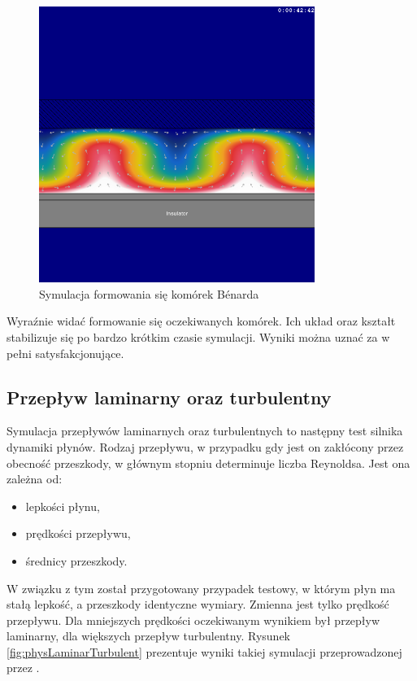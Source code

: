 \begin{figure}[!h]
\centering
\includegraphics[width=0.8\textwidth]{img/physics/benard}
\caption{Symulacja formowania się komórek Bénarda}
\label{fig:physBenard}
\end{figure}

Wyraźnie widać formowanie się oczekiwanych komórek. Ich układ oraz kształt
stabilizuje się po bardzo krótkim czasie symulacji. Wyniki można uznać za w
pełni satysfakcjonujące.

\subsection{Przepływ laminarny oraz turbulentny}
\label{sec:przeplywyLamTur}

Symulacja przepływów laminarnych oraz turbulentnych to następny test silnika
dynamiki płynów. Rodzaj przepływu, w przypadku gdy jest on zakłócony przez
obecność przeszkody, w głównym stopniu determinuje liczba Reynoldsa. Jest ona
zależna od:

\begin{itemize}
\item lepkości płynu,
\item prędkości przepływu,
\item średnicy przeszkody.
\end{itemize}

W związku z tym został przygotowany przypadek testowy, w którym płyn ma stałą
lepkość, a przeszkody identyczne wymiary. Zmienna jest tylko prędkość przepływu.
Dla mniejszych prędkości oczekiwanym wynikiem był przepływ laminarny, dla
większych przepływ turbulentny. Rysunek \ref{fig:physLaminarTurbulent}
prezentuje wyniki takiej symulacji przeprowadzonej przez \en.

